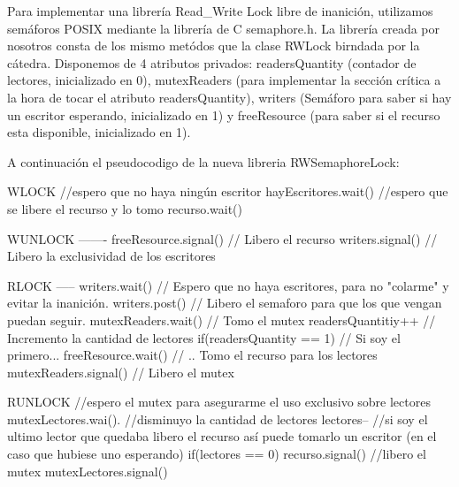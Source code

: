 Para implementar una librería Read_Write Lock libre de inanición, utilizamos semáforos POSIX mediante la librería de C semaphore.h. La librería creada por nosotros consta de los mismo metódos que la clase RWLock birndada por la cátedra. Disponemos de 4 atributos privados: readersQuantity (contador de lectores, inicializado en 0), mutexReaders (para implementar la sección crítica a la hora de tocar el atributo readersQuantity), writers (Semáforo para saber si hay un escritor esperando, inicializado en 1) y freeResource (para saber si el recurso esta disponible, inicializado en 1).

A continuación el pseudocodigo de la nueva libreria RWSemaphoreLock:

WLOCK
//espero que no haya ningún escritor
hayEscritores.wait()
//espero que se libere el recurso y lo tomo
recurso.wait()

WUNLOCK
-------				
	freeResource.signal()		// Libero el recurso	
	writers.signal()		// Libero la exclusividad de los escritores

RLOCK
-----
	writers.wait()			// Espero que no haya escritores, para no "colarme" y evitar la inanición.
	writers.post()			// Libero el semaforo para que los que vengan puedan seguir.
	mutexReaders.wait()		// Tomo el mutex
	readersQuantitiy++		// Incremento la cantidad de lectores
	if(readersQuantity == 1)	// Si soy el primero... 
		freeResource.wait()	// .. Tomo el recurso para los lectores
	mutexReaders.signal()		// Libero el mutex

RUNLOCK
//espero el mutex para asegurarme el uso exclusivo sobre lectores
mutexLectores.wai().
//disminuyo la cantidad de lectores
lectores--
//si soy el ultimo lector que quedaba libero el recurso así puede tomarlo un escritor (en el caso que hubiese uno esperando)
if(lectores == 0)
	recurso.signal()
//libero el mutex
mutexLectores.signal()
